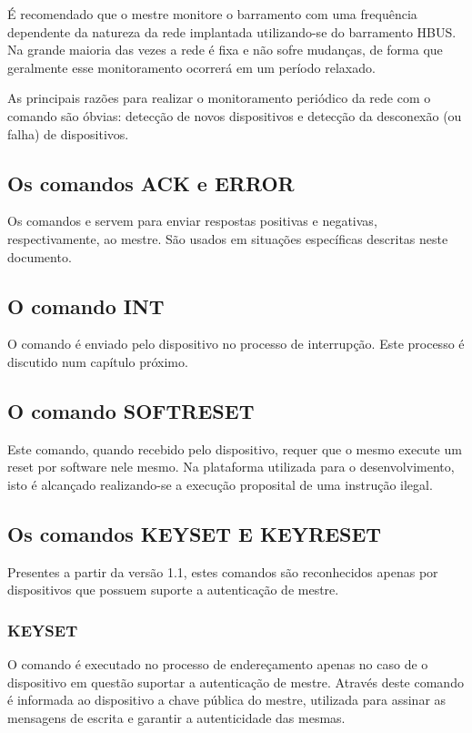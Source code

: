 É recomendado que o mestre monitore o barramento com uma frequência dependente da natureza da rede implantada utilizando-se do barramento HBUS. Na grande maioria das vezes a rede é fixa e não sofre mudanças, de forma que geralmente esse monitoramento ocorrerá em um período relaxado.

As principais razões para realizar o monitoramento periódico da rede com o comando  são óbvias:
detecção de novos dispositivos e detecção da desconexão (ou falha) de dispositivos.

\subsection{Os comandos ACK e ERROR}

Os comandos  e  servem para enviar respostas positivas e negativas, respectivamente, ao mestre. São usados em situações específicas descritas neste documento.

\subsection{O comando INT}

O comando  é enviado pelo dispositivo no processo de interrupção. Este processo é discutido num capítulo próximo.

\subsection{O comando SOFTRESET}

Este comando, quando recebido pelo dispositivo, requer que o mesmo execute um reset por software nele mesmo.
Na plataforma utilizada para o desenvolvimento, isto é alcançado realizando-se a execução proposital de uma instrução ilegal.

\subsection{Os comandos KEYSET E KEYRESET}

Presentes a partir da versão 1.1, estes comandos são reconhecidos apenas por dispositivos que possuem suporte a autenticação de mestre.

\subsubsection{KEYSET}

O comando  é executado no processo de endereçamento apenas no caso de o dispositivo em questão suportar a autenticação de mestre. Através deste comando é informada ao dispositivo a chave pública do mestre, utilizada para assinar as mensagens de escrita e garantir a autenticidade das mesmas.

